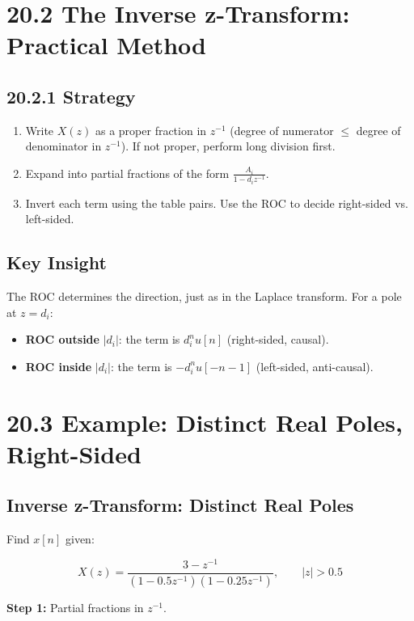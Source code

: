 \documentclass[11pt]{article}
\begin{document}
\section*{20.2 The Inverse z-Transform: Practical Method}

\subsection*{20.2.1 Strategy}

\begin{enumerate}
  \item Write $X(z)$ as a proper fraction in $z^{-1}$ (degree of numerator $\leq$ degree of denominator in $z^{-1}$). If not proper, perform long division first.
  \item Expand into partial fractions of the form $\frac{A_i}{1 - d_i z^{-1}}$.
  \item Invert each term using the table pairs. Use the ROC to decide right-sided vs. left-sided.
\end{enumerate}

\subsection*{Key Insight}

The ROC determines the direction, just as in the Laplace transform. For a pole at $z = d_i$:

\begin{itemize}
  \item \textbf{ROC outside} $|d_i|$: the term is $d_i^n u[n]$ (right-sided, causal).
  \item \textbf{ROC inside} $|d_i|$: the term is $-d_i^n u[-n-1]$ (left-sided, anti-causal).
\end{itemize}

\section*{20.3 Example: Distinct Real Poles, Right-Sided}

\subsection*{Inverse z-Transform: Distinct Real Poles}

Find $x[n]$ given:

\[X(z) = \frac{3 - z^{-1}}{(1 - 0.5 z^{-1})(1 - 0.25 z^{-1})}, \qquad |z| > 0.5\]

\textbf{Step 1:} Partial fractions in $z^{-1}$.
\end{document}
